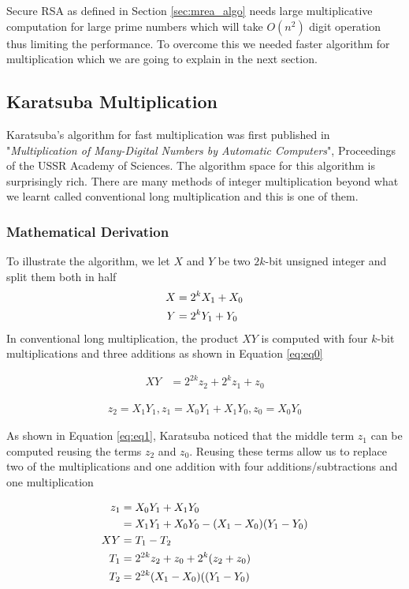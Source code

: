 \documentclass[12pt,journal,compsoc]{IEEEtran}
\begin{document}
Secure RSA as defined in Section \ref{sec:mrea_algo} needs large multiplicative computation for large prime numbers which will take $O(n^2)$ digit operation thus limiting the performance. To overcome this we needed faster algorithm for multiplication which we are going to explain in the next section.

\subsection{{Karatsuba Multiplication}}
\label{sec: karatsuba_code}
Karatsuba's algorithm for fast multiplication was first published in "\emph{Multiplication of Many-Digital Numbers by Automatic Computers}"\cite{karatsuba}, Proceedings of the USSR Academy of Sciences. The algorithm space for this algorithm is surprisingly rich. There are many methods of integer multiplication beyond what we learnt called conventional long multiplication and this is one of them. 

\subsubsection{\bf Mathematical Derivation}

To illustrate the algorithm, we let $X$ and $Y$ be two $2k$-bit unsigned integer and split them both in half
\begin{align}
X &= 2^{k}X_{1} + X_{0} \notag \\
Y &= 2^{k}Y_{1} + Y_{0} 
\end{align}
In conventional long multiplication, the product $XY$ is computed with four $k$-bit multiplications and three additions as shown in Equation \ref{eq:eq0}

\begin{align}
\label{eq:eq0}
XY &= 2^{2k}z_{2} + 2^{k}z_{1} + z_{0}
\end{align}

\begin{align}
\label{eq:eq1}
z_2 = X_{1}Y_{1}, z_{1} = X_{0}Y_{1} + X_{1}Y_{0}, z_{0} = X_{0}Y_{0}
\end{align}

As shown in Equation \ref{eq:eq1}, Karatsuba\cite{karatsuba} noticed that the middle term $z_1$ can be computed reusing the terms $z_2$ and $z_0$. Reusing these terms allow us to  replace two of the multiplications and one addition with four additions/subtractions and one multiplication

\begin{align}
z_{1} &=  X_{0}Y_{1} + X_{1}Y_{0} \notag\\
&=  X_{1}Y_{1} + X_{0}Y_{0} - (X_{1} - X_{0})(Y_{1} - Y_{0}) \notag\\
XY &= T_{1} - T_{2} \notag \\
T_{1} &= 2^{2k}z_{2} + z_{0} + 2^{k}(z_{2} + z_{0}) \notag \\
T_{2} &= 2^{2k}(X_{1} - X_{0})((Y_{1}-Y_{0})
\label{eq:eq2}
\end{align}
\end{document}
